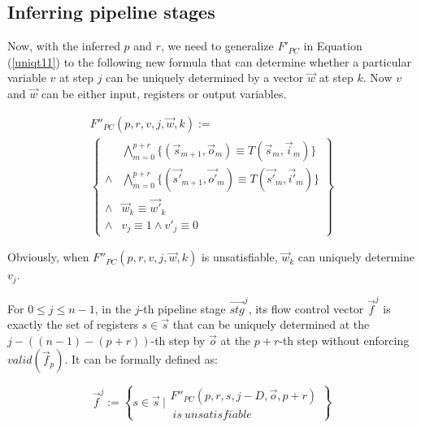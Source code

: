 \documentclass[conference]{IEEEtran}
\begin{document}
\subsection{Inferring pipeline stages}\label{subsec_inferstage}

Now,
with the inferred $p$ and $r$,
we need to generalize $F'_{PC}$ in Equation (\ref{uniqt11}) to the following new formula that
can determine whether a particular variable $v$ at step $j$
can be uniquely determined by a vector $\vec{w}$ at step $k$.
Now $v$ and $\vec{w}$ can be either input, registers or output variables.

\begin{multline}\label{uniqt2}
F''_{PC}(p,r,v,j,\vec{w},k):=\\
\left\{
\begin{array}{cc}
&\bigwedge_{m=0}^{p+r}
\{
(\vec{s}_{m+1},\vec{o}_m)\equiv T(\vec{s}_m,\vec{i}_m)
\}
\\
\wedge&\bigwedge_{m=0}^{p+r}
\{
(\vec{s'}_{m+1},\vec{o'}_m)\equiv T(\vec{s'}_m,\vec{i'}_m)
\}
\\
\wedge&\vec{w}_{k}\equiv \vec{w'}_{k} \\
\wedge& v_{j}\equiv 1 \wedge  v'_{j}\equiv 0 
\end{array}
\right\}
\end{multline}

Obviously,
when $F''_{PC}(p,r,v,j,\vec{w},k)$ is unsatisfiable,
$\vec{w}_k$ can uniquely determine $v_j$.

For $0\le j\le n-1$,
in the $j$-th pipeline stage $\vec{stg}^j$,
its flow control vector $\vec{f}^j$ is exactly the set of registers $s\in \vec{s}$ 
that can be uniquely determined at the $j-((n-1)-(p+r))$-th step by $\vec{o}$ 
at the $p+r$-th step without enforcing $valid(\vec{f}_p)$.
It can be formally defined as:

\begin{equation}\label{stgn_fj}
\vec{f}^{j} := 
 \left\{
 s\in \vec{s} ~| 
\begin{array}{cc}
 F''_{PC}(p,r,s,j-D,\vec{o},p+r)\\
 ~is~unsatisfiable
\end{array}
\right\}
\end{equation}
\end{document}
